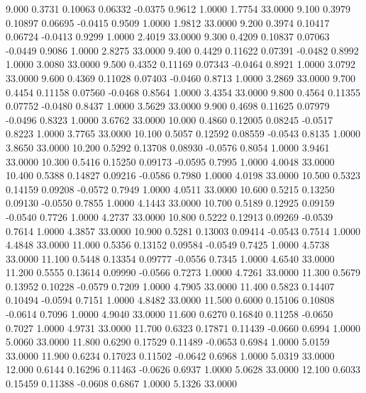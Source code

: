    9.000   0.3731   0.10063   0.06332  -0.0375   0.9612   1.0000   1.7754  33.0000
   9.100   0.3979   0.10897   0.06695  -0.0415   0.9509   1.0000   1.9812  33.0000
   9.200   0.3974   0.10417   0.06724  -0.0413   0.9299   1.0000   2.4019  33.0000
   9.300   0.4209   0.10837   0.07063  -0.0449   0.9086   1.0000   2.8275  33.0000
   9.400   0.4429   0.11622   0.07391  -0.0482   0.8992   1.0000   3.0080  33.0000
   9.500   0.4352   0.11169   0.07343  -0.0464   0.8921   1.0000   3.0792  33.0000
   9.600   0.4369   0.11028   0.07403  -0.0460   0.8713   1.0000   3.2869  33.0000
   9.700   0.4454   0.11158   0.07560  -0.0468   0.8564   1.0000   3.4354  33.0000
   9.800   0.4564   0.11355   0.07752  -0.0480   0.8437   1.0000   3.5629  33.0000
   9.900   0.4698   0.11625   0.07979  -0.0496   0.8323   1.0000   3.6762  33.0000
  10.000   0.4860   0.12005   0.08245  -0.0517   0.8223   1.0000   3.7765  33.0000
  10.100   0.5057   0.12592   0.08559  -0.0543   0.8135   1.0000   3.8650  33.0000
  10.200   0.5292   0.13708   0.08930  -0.0576   0.8054   1.0000   3.9461  33.0000
  10.300   0.5416   0.15250   0.09173  -0.0595   0.7995   1.0000   4.0048  33.0000
  10.400   0.5388   0.14827   0.09216  -0.0586   0.7980   1.0000   4.0198  33.0000
  10.500   0.5323   0.14159   0.09208  -0.0572   0.7949   1.0000   4.0511  33.0000
  10.600   0.5215   0.13250   0.09130  -0.0550   0.7855   1.0000   4.1443  33.0000
  10.700   0.5189   0.12925   0.09159  -0.0540   0.7726   1.0000   4.2737  33.0000
  10.800   0.5222   0.12913   0.09269  -0.0539   0.7614   1.0000   4.3857  33.0000
  10.900   0.5281   0.13003   0.09414  -0.0543   0.7514   1.0000   4.4848  33.0000
  11.000   0.5356   0.13152   0.09584  -0.0549   0.7425   1.0000   4.5738  33.0000
  11.100   0.5448   0.13354   0.09777  -0.0556   0.7345   1.0000   4.6540  33.0000
  11.200   0.5555   0.13614   0.09990  -0.0566   0.7273   1.0000   4.7261  33.0000
  11.300   0.5679   0.13952   0.10228  -0.0579   0.7209   1.0000   4.7905  33.0000
  11.400   0.5823   0.14407   0.10494  -0.0594   0.7151   1.0000   4.8482  33.0000
  11.500   0.6000   0.15106   0.10808  -0.0614   0.7096   1.0000   4.9040  33.0000
  11.600   0.6270   0.16840   0.11258  -0.0650   0.7027   1.0000   4.9731  33.0000
  11.700   0.6323   0.17871   0.11439  -0.0660   0.6994   1.0000   5.0060  33.0000
  11.800   0.6290   0.17529   0.11489  -0.0653   0.6984   1.0000   5.0159  33.0000
  11.900   0.6234   0.17023   0.11502  -0.0642   0.6968   1.0000   5.0319  33.0000
  12.000   0.6144   0.16296   0.11463  -0.0626   0.6937   1.0000   5.0628  33.0000
  12.100   0.6033   0.15459   0.11388  -0.0608   0.6867   1.0000   5.1326  33.0000
